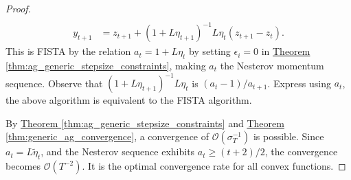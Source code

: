 \documentclass[12pt]{article}
\begin{document}
\begin{proof}
\begin{align*}
                \\
                y_{t + 1} &= z_{t + 1} + (1 + L\eta_{t + 1})^{-1}L\eta_t (z_{t + 1} - z_t).
            \end{align*}
            This is FISTA by the relation $a_t = 1 + L\eta_t$ by setting $\epsilon_i = 0$ in
            \hyperref[thm:ag_generic_stepsize_constraints]
            {Theorem \ref*{thm:ag_generic_stepsize_constraints}}, 
            making $a_t$ the Nesterov momentum sequence. 
            Observe that $(1 + L\eta_{t + 1})^{-1}L\eta_t$ is $(a_t - 1)/a_{t + 1}$.
            Express using $a_t$, the above algorithm is equivalent to the FISTA algorithm. 
            \par
            By 
            \hyperref[thm:ag_generic_stepsize_constraints]{Theorem \ref*{thm:ag_generic_stepsize_constraints}}
            and 
            \hyperref[thm:generic_ag_convergence]{Theorem \ref*{thm:generic_ag_convergence}},
            a convergence of $\mathcal O(\sigma_T^{-1})$ is possible. 
            Since $a_t = L\tilde \eta_t$, and the Nesterov sequence exhibits $a_{t} \ge (t + 2)/2$, the convergence becomes $\mathcal O(T^{-2})$. 
            It is the optimal convergence rate for all convex functions. 
        \end{proof}
\end{document}
